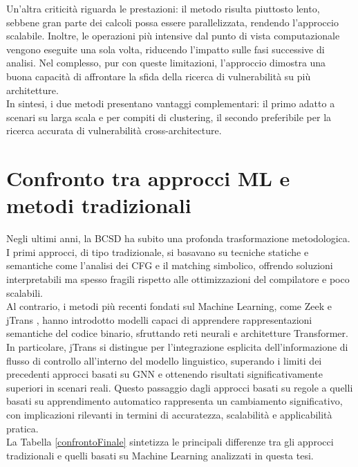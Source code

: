 \documentclass[12pt,a4paper,openright,twoside]{report}
\begin{document}
Un’altra criticità riguarda le prestazioni: il metodo risulta piuttosto lento, sebbene gran parte dei calcoli possa essere parallelizzata, rendendo l’approccio scalabile. Inoltre, le operazioni più intensive dal punto di vista computazionale vengono eseguite una sola volta, riducendo l’impatto sulle fasi successive di analisi. Nel complesso, pur con queste limitazioni, l’approccio dimostra una buona capacità di affrontare la sfida della ricerca di vulnerabilità su più architetture.\\
In sintesi, i due metodi presentano vantaggi complementari: il primo adatto a scenari su larga scala e per compiti di clustering, il secondo preferibile per la ricerca accurata di vulnerabilità cross-architecture.

\section{Confronto tra approcci ML e metodi tradizionali}



Negli ultimi anni, la BCSD ha subito una profonda trasformazione metodologica. I primi approcci, di tipo tradizionale, si basavano su tecniche statiche e semantiche come l’analisi dei CFG e il matching simbolico, offrendo soluzioni interpretabili ma spesso fragili rispetto alle ottimizzazioni del compilatore e poco scalabili. \\
Al contrario, i metodi più recenti fondati sul Machine Learning, come Zeek \cite{Zeek} e jTrans \cite{jTrans}, hanno introdotto modelli capaci di apprendere rappresentazioni semantiche del codice binario, sfruttando reti neurali e architetture Transformer. In particolare, jTrans si distingue per l’integrazione esplicita dell’informazione di flusso di controllo all’interno del modello linguistico, superando i limiti dei precedenti approcci basati su GNN e ottenendo risultati significativamente superiori in scenari reali. Questo passaggio dagli approcci basati su regole a quelli basati su apprendimento automatico rappresenta un cambiamento significativo, con implicazioni rilevanti in termini di accuratezza, scalabilità e applicabilità pratica.\\
La Tabella \ref{confrontoFinale} sintetizza le principali differenze tra gli approcci tradizionali e quelli basati su Machine Learning analizzati in questa tesi.
\end{document}
